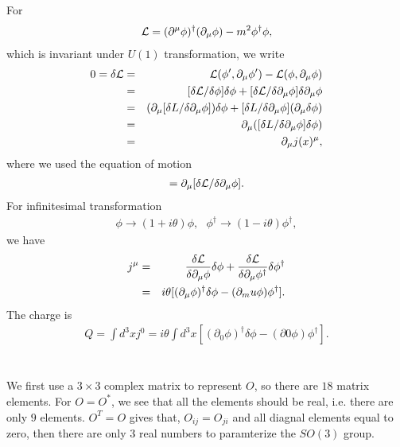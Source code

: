 \documentclass[11pt]{article}
\def\del{{\partial}}
\begin{document}
\section{ }
For
\begin{eqnarray}
    {\cal L}  =  (\del^\mu \phi)^\dagger (\del_\mu \phi) -m^2 \phi^\dagger \phi,
\end{eqnarray}
which is invariant under $U(1)$ transformation, we write
\begin{eqnarray}
    0 = \delta {\cal L} &=& {\cal L}(\phi', \del_\mu \phi') - {\cal L}(\phi, \del_\mu \phi)\\
  &=&  [\delta {\cal L} / \delta{\phi}] \delta\phi +  [\delta {\cal L} / \delta{\del_\mu \phi}] \delta{\del_\mu \phi}\\
  &=& (\del_\mu [\delta L/\delta{\del_\mu \phi}]) \delta\phi +  [\delta L / \delta{\del_\mu \phi}] (\del_\mu \delta\phi) \\
  &=& \del_\mu ([\delta L/\delta{\del_\mu \phi}] \delta\phi) \\&=&  \del_\mu j(x)^\mu,
\end{eqnarray}
where we used the equation of motion
\begin{eqnarray}
    [\delta {\cal L} / \delta{\phi}]  =  \del_\mu [\delta {\cal L}/\delta{\del_\mu \phi}].
\end{eqnarray}
For infinitesimal transformation
\begin{eqnarray}
    \phi \to (1+i\theta )\phi, ~~~ \phi^\dagger  \to (1-i\theta )\phi^\dagger,
\end{eqnarray}
we have
\begin{eqnarray}
    j^\mu &=& \frac{\delta {\cal L}}{\delta \del_\mu \phi } \delta \phi +\frac{\delta {\cal L}}{\delta \del_\mu \phi^\dagger } \delta \phi^\dagger \\
    &=& i\theta [ (\del_\mu \phi)^\dagger \delta \phi - (\del_mu \phi) \phi^\dagger].
\end{eqnarray}
The charge is
\begin{eqnarray}
    Q=\int d^3x j^0= i\theta \int d^3 x [ (\del_0 \phi)^\dagger \delta \phi - (\del0 \phi) \phi^\dagger].
\end{eqnarray}

\section{ }
We first use a $3\times 3$ complex matrix to represent $O$, so there are $18$ matrix elements. For $O=O^*$, we see that all the elements should be real, i.e. there are only $9$ elements. $O^T=O$ gives that, $O_{ij}=O_{ji}$ and all diagnal elements equal to zero, then there are only $3$ real numbers to paramterize the $SO(3)$ group.
\end{document}
